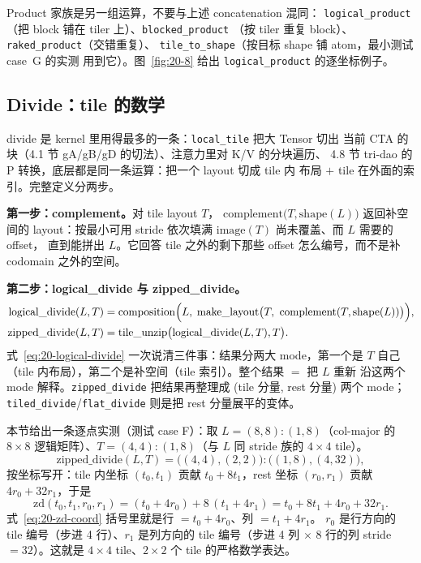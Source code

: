 Product 家族是另一组运算，不要与上述 concatenation 混同：
\texttt{logical\_\allowbreak{}product}（把 block 铺在 tiler 上）、\texttt{blocked\_\allowbreak{}product}
（按 tiler 重复 block）、\texttt{raked\_\allowbreak{}product}（交错重复）、
\texttt{tile\_\allowbreak{}to\_\allowbreak{}shape}（按目标 shape 铺 atom，最小测试 case~G 的实测
用到它）。图~\ref{fig:20-8} 给出 \texttt{logical\_product} 的逐坐标例子。

\subsection{Divide：tile 的数学}

divide 是 kernel 里用得最多的一条：\texttt{local\_tile} 把大 Tensor 切出
当前 CTA 的块（4.1 节 gA/gB/gD 的切法）、注意力里对 K/V 的分块遍历、
4.8 节 tri-dao 的 P 转换，底层都是同一条运算：把一个 layout 切成 tile 内
布局 $+$ tile 在外面的索引。完整定义分两步。

\textbf{第一步：complement。}对 tile layout $T$，
$\mathrm{complement}\bigl(T,\mathrm{shape}(L)\bigr)$ 返回补空间的
layout：按最小可用 stride 依次填满 $\mathrm{image}(T)$ 尚未覆盖、而 $L$ 需要的 offset，
直到能拼出 $L$。它回答 tile 之外的剩下那些 offset 怎么编号，而不是补 codomain 之外的空间。

\textbf{第二步：logical\_divide 与 zipped\_divide。}
\begin{align}
  \mathrm{logical\_divide}(L,T) &=
    \mathrm{composition}\Bigl(L,\;
      \mathrm{make\_layout}\bigl(T,\ \mathrm{complement}(T,\mathrm{shape}(L))\bigr)
    \Bigr), \label{eq:20-logical-divide} \\
  \mathrm{zipped\_divide}(L,T) &= \mathrm{tile\_unzip}\bigl(\mathrm{logical\_divide}(L,T),T\bigr).
    \label{eq:20-zipped-divide}
\end{align}
式~\eqref{eq:20-logical-divide} 一次说清三件事：结果分两大 mode，第一个是
$T$ 自己（tile 内布局），第二个是补空间（tile 索引）。整个结果 $=$ 把 $L$ 重新
沿这两个 mode 解释。\texttt{zipped\_\allowbreak{}divide} 把结果再整理成 (tile 分量,
rest 分量) 两个 mode；\texttt{tiled\_\allowbreak{}divide}/\texttt{flat\_divide}
则是把 rest 分量展平的变体。

本节给出一条逐点实测（测试 case F）：取 $L=(8,8){:}(1,8)$（col-major 的
$8\times8$ 逻辑矩阵）、$T=(4,4){:}(1,8)$（与 $L$ 同 stride 族的 $4\times4$ tile）。
\begin{equation}
  \mathrm{zipped\_divide}(L,T) = \bigl((4,4),(2,2)\bigr){:}\bigl((1,8),(4,32)\bigr),
  \label{eq:20-zd-example}
\end{equation}
按坐标写开：tile 内坐标 $(t_0,t_1)$ 贡献 $t_0+8t_1$，rest 坐标 $(r_0,r_1)$
贡献 $4r_0+32r_1$，于是
\begin{equation}
  \mathrm{zd}(t_0,t_1,r_0,r_1)
  = (t_0+4r_0) + 8\,(t_1+4r_1)
  = t_0 + 8t_1 + 4r_0 + 32r_1 .
  \label{eq:20-zd-coord}
\end{equation}
式~\eqref{eq:20-zd-coord} 括号里就是行 $= t_0+4r_0$、列 $= t_1+4r_1$。
$r_0$ 是行方向的 tile 编号（步进 4 行）、$r_1$ 是列方向的 tile 编号（步进
4 列 $\times$ 8 行的列 stride $=32$）。这就是 $4\times4$ tile、$2\times2$ 个
tile 的严格数学表达。

